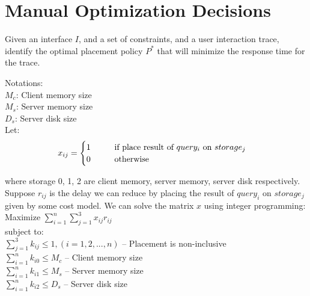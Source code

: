 


\section*{Manual Optimization Decisions}

\begin{problem}
  Given an interface $I$, and a set of constraints, and a user interaction trace, identify the optimal placement policy $P^*$ that will minimize the response time for the trace.
\end{problem}

Notations:\\

\hspace{10mm} $M_c$: Client memory size\\

\hspace{10mm} $M_s$: Server memory size\\

\hspace{10mm} $D_s$: Server disk size\\

Let:
\begin{equation}
	x_{ij}=
	\begin{cases}
		1 \hspace{10mm} \text{if place result of $query_i$ on $storage_j$} \\
		0 \hspace{10mm} \text{otherwise}
	\end{cases}
\end{equation}

where storage 0, 1, 2 are client memory, server memory, server disk respectively. Suppose $r_{ij}$ is the delay we can reduce by placing the result of $query_i$ on $storage_j$ given by some cost model. We can solve the matrix $x$ using integer programming:\\

\hspace{10mm} Maximize $\sum_{i=1}^{n} \sum_{j=1}^{3} x_{ij} r_{ij}$\\

subject to:\\

\hspace{10mm} $\sum_{j=1}^{3} k_{ij} \le 1, (i=1,2,...,n)$ \hspace{10mm} -- Placement is non-inclusive\\

\hspace{10mm} $\sum_{i=1}^{n} k_{i0} \le M_c$ \hspace{10mm} -- Client memory size\\

\hspace{10mm} $\sum_{i=1}^{n} k_{i1} \le M_s$ \hspace{10mm} -- Server memory size\\

\hspace{10mm} $\sum_{i=1}^{n} k_{i2} \le D_s$ \hspace{10mm} -- Server disk size\\
  

